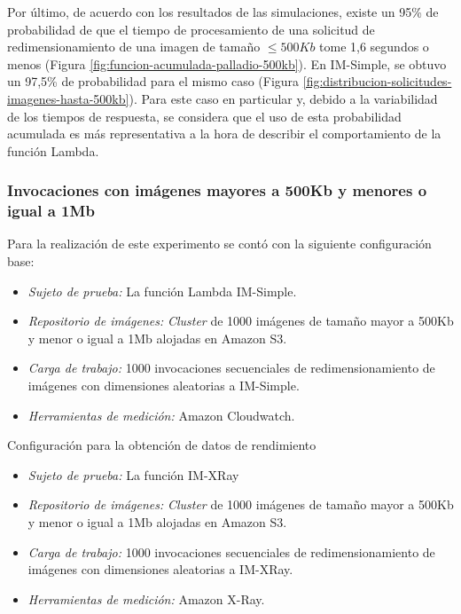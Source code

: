 Por último, de acuerdo con los resultados de las simulaciones, existe un 95\% de probabilidad de que el tiempo de procesamiento de una solicitud de redimensionamiento de una imagen de tamaño $\leq 500Kb$ tome 1,6 segundos o menos (Figura \ref{fig:funcion-acumulada-palladio-500kb}). En IM-Simple, se obtuvo un 97,5\% de probabilidad para el mismo caso (Figura \ref{fig:distribucion-solicitudes-imagenes-hasta-500kb}). Para este caso en particular y, debido a la variabilidad de los tiempos de respuesta, se considera que el uso de esta probabilidad acumulada es más representativa a la hora de describir el comportamiento de la función Lambda.


\subsubsection{Invocaciones con imágenes mayores a 500Kb y menores o igual a 1Mb}
Para la realización de este experimento se contó con la siguiente configuración base:
\begin{itemize}
    \item \emph{Sujeto de prueba:} La función Lambda IM-Simple.
    \item \emph{Repositorio de imágenes:} \emph{Cluster} de 1000 imágenes de tamaño mayor a 500Kb y menor o igual a 1Mb alojadas en Amazon S3.     
    \item \emph{Carga de trabajo:} 1000 invocaciones secuenciales de redimensionamiento de imágenes con dimensiones aleatorias a IM-Simple.
    \item \emph{Herramientas de medición:} Amazon Cloudwatch.
\end{itemize}

Configuración para la obtención de datos de rendimiento

\begin{itemize}
    \item \emph{Sujeto de prueba:} La función IM-XRay
    \item \emph{Repositorio de imágenes:} \emph{Cluster} de 1000 imágenes de tamaño mayor a 500Kb y menor o igual a 1Mb alojadas en Amazon S3.     
    \item \emph{Carga de trabajo:} 1000 invocaciones secuenciales de redimensionamiento de imágenes con dimensiones aleatorias a IM-XRay.
    \item \emph{Herramientas de medición:} Amazon X-Ray.
\end{itemize}

